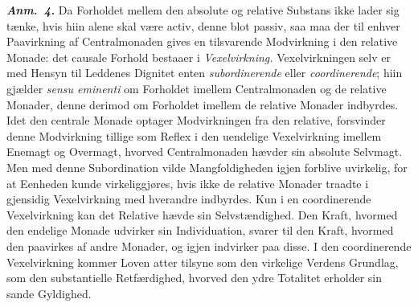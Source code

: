 \documentclass[12pt]{book}
\newcommand{\anm}[1]{\emph{\textbf{Anm.~#1.}}}
\begin{document}
\anm{4} Da Forholdet mellem den absolute og relative Substans ikke lader sig tænke,
hvis hiin alene skal være activ, denne blot passiv, saa maa der til enhver Paavirkning
af Centralmonaden gives en tilsvarende Modvirkning i den relative Monade: det causale
Forhold bestaaer i \emph{Vexelvirkning.} Vexelvirkningen selv er med Hensyn til
Leddenes Dignitet enten \emph{subordinerende} eller \emph{coordinerende}; hiin gjælder
\textit{sensu eminenti} om Forholdet imellem Centralmonaden og de relative Monader,
denne derimod om Forholdet imellem de relative Monader indbyrdes. Idet den centrale
Monade optager Modvirkningen fra den relative, forsvinder denne Modvirkning tillige som
Reflex i den uendelige Vexelvirkning imellem Enemagt og Overmagt, hvorved
Centralmonaden hævder sin absolute Selvmagt. Men med denne Subordination vilde
Mangfoldigheden igjen forblive uvirkelig, for at Eenheden kunde virkeliggjøres, hvis
ikke de relative Monader traadte i gjensidig Vexelvirkning med hverandre indbyrdes. Kun
i en coordinerende Vexelvirkning kan det Relative hævde sin Selvstændighed. Den Kraft,
hvormed den endelige Monade udvirker sin Individuation, svarer til den Kraft, hvormed
den paavirkes af andre Monader, og igjen indvirker paa disse. I den coordinerende
Vexelvirkning kommer Loven atter tilsyne som den virkelige Verdens Grundlag, som den
substantielle Retfærdighed, hvorved den ydre Totalitet erholder sin sande Gyldighed.
\end{document}
